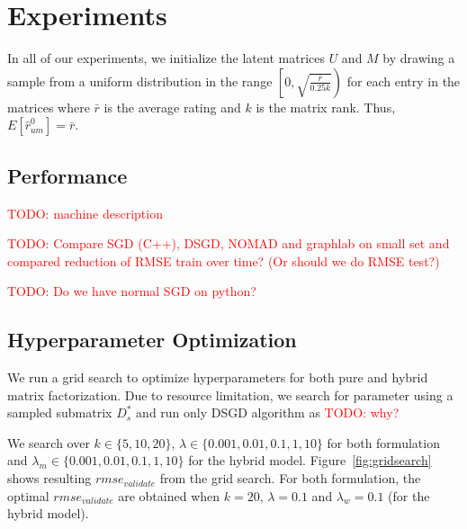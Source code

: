 \documentclass{article} %
\newcommand{\todo}[1]{\textcolor{red}{TODO: #1}}
\begin{document}
\section{Experiments}

In all of our experiments,  we initialize the latent matrices $U$ and $M$ by drawing a sample from a uniform distribution in the range $\left[0,\sqrt{\frac{\bar{r}}{0.25k}}\right)$ for each entry in the matrices where $\bar{r}$ is the average rating and $k$ is the matrix rank. Thus, $E[\hat{r}_{um}^0] = \bar{r}$.

\subsection{Performance}

\todo{machine description}

\todo{Compare SGD (C++), DSGD, NOMAD and graphlab on small set and compared reduction of RMSE train over time?  (Or should we do RMSE test?)}

\todo{Do we have normal SGD on python?}

\subsection{Hyperparameter Optimization}

We run a grid search to optimize hyperparameters for both pure and hybrid
matrix factorization.
Due to resource limitation, we search for parameter using a sampled submatrix
$D_s^*$ and run only DSGD algorithm as \todo{why?}

We search over $k \in \{5, 10, 20\}$, $\lambda \in \{
0.001, 0.01, 0.1, 1, 10\}$ for both formulation and $\lambda_m \in \{
0.001, 0.01, 0.1, 1, 10\}$ for the hybrid model.  Figure~\ref{fig:gridsearch} shows resulting $rmse_{validate}$ from the grid search.  For both formulation, the optimal $rmse_{validate}$ are obtained when
$k=20$, $\lambda=0.1$ and $\lambda_w=0.1$ (for the hybrid model).
\end{document}
